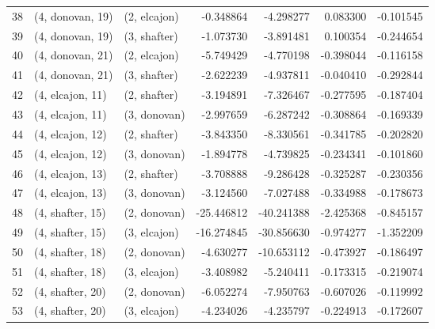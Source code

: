 \begin{tabular}{lllrrrr}
38 &  (4, donovan, 19) &     (2, elcajon) &  -0.348864 &  -4.298277 &   0.083300 & -0.101545 \\
39 &  (4, donovan, 19) &     (3, shafter) &  -1.073730 &  -3.891481 &   0.100354 & -0.244654 \\
40 &  (4, donovan, 21) &     (2, elcajon) &  -5.749429 &  -4.770198 &  -0.398044 & -0.116158 \\
41 &  (4, donovan, 21) &     (3, shafter) &  -2.622239 &  -4.937811 &  -0.040410 & -0.292844 \\
42 &  (4, elcajon, 11) &     (2, shafter) &  -3.194891 &  -7.326467 &  -0.277595 & -0.187404 \\
43 &  (4, elcajon, 11) &     (3, donovan) &  -2.997659 &  -6.287242 &  -0.308864 & -0.169339 \\
44 &  (4, elcajon, 12) &     (2, shafter) &  -3.843350 &  -8.330561 &  -0.341785 & -0.202820 \\
45 &  (4, elcajon, 12) &     (3, donovan) &  -1.894778 &  -4.739825 &  -0.234341 & -0.101860 \\
46 &  (4, elcajon, 13) &     (2, shafter) &  -3.708888 &  -9.286428 &  -0.325287 & -0.230356 \\
47 &  (4, elcajon, 13) &     (3, donovan) &  -3.124560 &  -7.027488 &  -0.334988 & -0.178673 \\
48 &  (4, shafter, 15) &     (2, donovan) & -25.446812 & -40.241388 &  -2.425368 & -0.845157 \\
49 &  (4, shafter, 15) &     (3, elcajon) & -16.274845 & -30.856630 &  -0.974277 & -1.352209 \\
50 &  (4, shafter, 18) &     (2, donovan) &  -4.630277 & -10.653112 &  -0.473927 & -0.186497 \\
51 &  (4, shafter, 18) &     (3, elcajon) &  -3.408982 &  -5.240411 &  -0.173315 & -0.219074 \\
52 &  (4, shafter, 20) &     (2, donovan) &  -6.052274 &  -7.950763 &  -0.607026 & -0.119992 \\
53 &  (4, shafter, 20) &     (3, elcajon) &  -4.234026 &  -4.235797 &  -0.224913 & -0.172607 \\
\bottomrule
\end{tabular}
